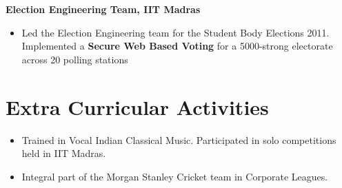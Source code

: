 \documentclass[margin,line]{resume}
\begin{document}
\begin{resume}
\textbf{Election Engineering Team, IIT Madras}
\vspace{1mm}
\begin{itemize}[leftmargin=*]
\item Led the Election Engineering team for the Student Body Elections 2011. Implemented a \textbf{Secure Web Based Voting} for a 5000-strong electorate across 20 polling stations
\end{itemize}

\section{\mysidestyle Extra Curricular Activities}
\begin{itemize}[leftmargin=*]
\item Trained in Vocal Indian Classical Music. Participated in solo competitions held in IIT Madras.
\item Integral part of the Morgan Stanley Cricket team in Corporate Leagues.
\end{itemize}
\end{resume}
\end{document}
